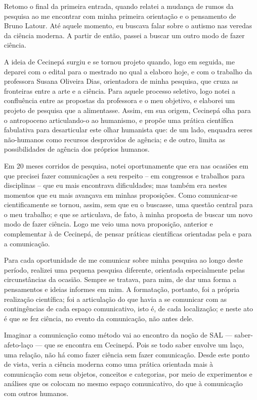 Retomo o final da primeira entrada, quando relatei a mudança de rumos da pesquisa ao me encontrar com minha primeira orientação e o pensamento de Bruno Latour. Até aquele momento, eu buscava falar sobre o autismo nas veredas da ciência moderna. A partir de então, passei a buscar um outro modo de fazer ciência.

A ideia de Cecinepá surgiu e se tornou projeto quando, logo em seguida, me deparei com o edital para o mestrado no qual a elaboro hoje, e com o trabalho da professora Susana Oliveira Dias, orientadora de minha pesquisa, que cruza as fronteiras entre a arte e a ciência. Para aquele processo seletivo, logo notei a confluência entre as propostas da professora e o meu objetivo, e elaborei um projeto de pesquisa que a alimentasse. Assim, em sua origem, Cecinepá olha para o antropoceno articulando-o ao humanismo, e propõe uma prática científica fabulativa para desarticular este olhar humanista que: de um lado, enquadra seres não-humanos como recursos desprovidos de agência; e de outro, limita as possibilidades de agência dos próprios humanos.

Em 20 meses corridos de pesquisa, notei oportunamente que era nas ocasiões em que precisei fazer comunicações a seu respeito -- em congressos e trabalhos para disciplinas -- que eu mais encontrava dificuldades; mas também era nestes momentos que eu mais avançava em minhas proposições. Como comunicar-se cientificamente se tornou, assim, sem que eu o buscasse, uma questão central para o meu trabalho; e que se articulava, de fato, à minha proposta de buscar um novo modo de fazer ciência. Logo me veio uma nova proposição, anterior e complementar à de Cecinepá, de pensar práticas científicas orientadas pela e para a comunicação.

Para cada oportunidade de me comunicar sobre minha pesquisa ao longo deste período, realizei uma pequena pesquisa diferente, orientada especialmente pelas circunstâncias da ocasião. Sempre se tratava, para mim, de dar uma forma a pensamentos e ideias informes em mim. A formatação, portanto, foi a própria realização científica; foi a articulação do que havia a se comunicar com as contingências de cada espaço comunicativo, isto é, de cada localização; e neste ato é que se fez ciência, no evento da comunicação, não antes dele.

Imaginar a comunicação como método vai ao encontro da noção de SAL --- saber-afeto-laço --- que se encontra em Cecinepá. Pois se todo saber envolve um laço, uma relação, não há como fazer ciência sem fazer comunicação. Desde este ponto de vista, veria a ciência moderna como uma prática orientada mais à comunicação com seus objetos, conceitos e categorias, por meio de experimentos e análises que os colocam no mesmo espaço comunicativo, do que à comunicação com outros humanos.

